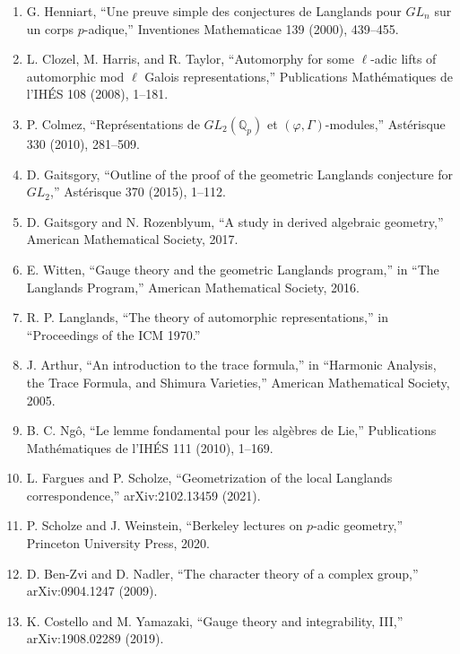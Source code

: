 \begin{enumerate}
\item G. Henniart, ``Une preuve simple des conjectures de Langlands pour $GL_n$ sur un corps $p$-adique,'' Inventiones Mathematicae 139 (2000), 439--455.
\item L. Clozel, M. Harris, and R. Taylor, ``Automorphy for some $\ell$-adic lifts of automorphic mod $\ell$ Galois representations,'' Publications Math\'ematiques de l'IH\'ES 108 (2008), 1--181.
\item P. Colmez, ``Repr\'esentations de $GL_2(\mathbb{Q}_p)$ et $(\varphi, \Gamma)$-modules,'' Ast\'erisque 330 (2010), 281--509.
\item D. Gaitsgory, ``Outline of the proof of the geometric Langlands conjecture for $GL_2$,'' Ast\'erisque 370 (2015), 1--112.
\item D. Gaitsgory and N. Rozenblyum, ``A study in derived algebraic geometry,'' American Mathematical Society, 2017.
\item E. Witten, ``Gauge theory and the geometric Langlands program,'' in ``The Langlands Program,'' American Mathematical Society, 2016.
\item R. P. Langlands, ``The theory of automorphic representations,'' in ``Proceedings of the ICM 1970.''
\item J. Arthur, ``An introduction to the trace formula,'' in ``Harmonic Analysis, the Trace Formula, and Shimura Varieties,'' American Mathematical Society, 2005.
\item B. C. Ng\^o, ``Le lemme fondamental pour les alg\`ebres de Lie,'' Publications Math\'ematiques de l'IH\'ES 111 (2010), 1--169.
\item L. Fargues and P. Scholze, ``Geometrization of the local Langlands correspondence,'' arXiv:2102.13459 (2021).
\item P. Scholze and J. Weinstein, ``Berkeley lectures on $p$-adic geometry,'' Princeton University Press, 2020.
\item D. Ben-Zvi and D. Nadler, ``The character theory of a complex group,'' arXiv:0904.1247 (2009).
\item K. Costello and M. Yamazaki, ``Gauge theory and integrability, III,'' arXiv:1908.02289 (2019).
\end{enumerate}
